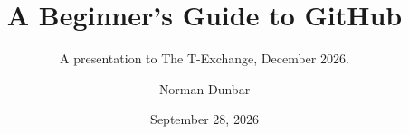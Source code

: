\documentclass[graybox,envcountchap,sectrefs]{svmonoND}
\begin{document}
\author{Norman Dunbar}
\title{A Beginner's Guide to GitHub}
\date{September 28, 2026}
\subtitle{A presentation to The T-Exchange, December 2026.}
\maketitle

\frontmatter%

\tableofcontents



\mainmatter%









\appendixpage
\appendix









\backmatter%
%
%

\end{document}
